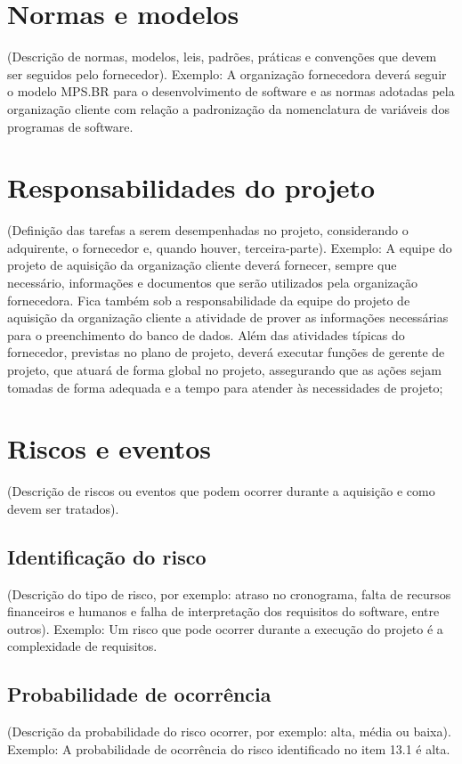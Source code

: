 \section{Normas e modelos}
(Descrição de normas, modelos, leis, padrões, práticas e convenções que devem
ser seguidos pelo fornecedor).
Exemplo: A organização fornecedora deverá seguir o modelo MPS.BR para o
desenvolvimento de software e as normas adotadas pela organização cliente com
relação a padronização da nomenclatura de variáveis dos programas de software.

\section{Responsabilidades do projeto}
(Definição das tarefas a serem desempenhadas no projeto, considerando o
adquirente, o fornecedor e, quando houver, terceira-parte).
Exemplo: A equipe do projeto de aquisição da organização cliente deverá fornecer,
sempre que necessário, informações e documentos que serão utilizados pela
organização fornecedora. Fica também sob a responsabilidade da equipe do projeto
de aquisição da organização cliente a atividade de prover as informações
necessárias para o preenchimento do banco de dados. Além das atividades típicas
do fornecedor, previstas no plano de projeto, deverá executar funções de gerente de
projeto, que atuará de forma global no projeto, assegurando que as ações sejam
tomadas de forma adequada e a tempo para atender às necessidades de projeto;

\section{Riscos e eventos}
(Descrição de riscos ou eventos que podem ocorrer durante a aquisição e como
devem ser tratados).

\subsection{Identificação do risco}
(Descrição do tipo de risco, por exemplo: atraso no cronograma, falta
de recursos financeiros e humanos e falha de interpretação dos requisitos do
software, entre outros).
Exemplo: Um risco que pode ocorrer durante a execução do projeto é a
complexidade de requisitos.

\subsection{Probabilidade de ocorrência}
(Descrição da probabilidade do risco ocorrer, por exemplo: alta, média
ou baixa).
Exemplo: A probabilidade de ocorrência do risco identificado no item 13.1 é
alta.

